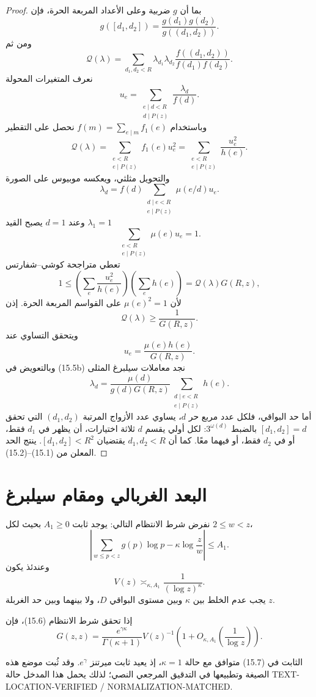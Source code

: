 \begin{proof}
بما أن \(g\) ضربية وعلى الأعداد المربعة الحرة، فإن
\[
g([d_1,d_2])
=
\frac{g(d_1)g(d_2)}{g((d_1,d_2))}.
\]
ومن ثم
\[
\mathcal Q(\lambda)
=
\sum_{d_1,d_2<R}
\lambda_{d_1}\lambda_{d_2}
\frac{f((d_1,d_2))}{f(d_1)f(d_2)}.
\]
نعرف المتغيرات المحولة
\[
u_e=
\sum_{\substack{e\mid d<R\\d\mid P(z)}}
\frac{\lambda_d}{f(d)}.
\]
وباستخدام \(f(m)=\sum_{e\mid m}f_1(e)\) نحصل على التقطير
\[
\mathcal Q(\lambda)
=
\sum_{\substack{e<R\\e\mid P(z)}}f_1(e)u_e^2
=
\sum_{\substack{e<R\\e\mid P(z)}}\frac{u_e^2}{h(e)}.
\tag{15.5a}
\]
والتحويل مثلثي، ويعكسه موبيوس على الصورة
\[
\lambda_d
=
f(d)
\sum_{\substack{d\mid e<R\\e\mid P(z)}}
\mu(e/d)u_e.
\tag{15.5b}
\]
وعند \(d=1\) يصبح القيد \(\lambda_1=1\)
\[
\sum_{\substack{e<R\\e\mid P(z)}}\mu(e)u_e=1.
\]
تعطي متراجحة كوشي--شفارتس
\[
1
\le
\left(\sum_e\frac{u_e^2}{h(e)}\right)
\left(\sum_e h(e)\right)
=
\mathcal Q(\lambda)G(R,z),
\]
لأن \(\mu(e)^2=1\) على القواسم المربعة الحرة. إذن
\[
\mathcal Q(\lambda)\ge\frac1{G(R,z)}.
\]
ويتحقق التساوي عند
\[
u_e=\frac{\mu(e)h(e)}{G(R,z)}.
\]
وبالتعويض في (15.5b) نجد معاملات سيلبرغ المثلى
\[
\boxed{
\lambda_d
=
\frac{\mu(d)}{g(d)G(R,z)}
\sum_{\substack{d\mid e<R\\e\mid P(z)}}h(e)
}.
\tag{15.5c}
\]
أما حد البواقي، فلكل عدد مربع حر \(d\)، يساوي عدد الأزواج المرتبة
\((d_1,d_2)\) التي تحقق \([d_1,d_2]=d\) بالضبط \(3^{\omega(d)}\): لكل أولي
يقسم \(d\) ثلاثة اختيارات، أن يظهر في \(d_1\) فقط، أو في \(d_2\) فقط، أو
فيهما معًا. كما أن \(d_1,d_2<R\) يقتضيان \([d_1,d_2]<R^2\). ينتج الحد
المعلن من (15.1)--(15.2).
\end{proof}

\section{البعد الغربالي ومقام سيلبرغ}

نفرض شرط الانتظام التالي: يوجد ثابت \(A_1\ge0\) بحيث لكل \(2\le w<z\)،
\[
\left|
\sum_{w\le p<z}g(p)\log p
-
\kappa\log\frac zw
\right|
\le A_1.
\tag{15.6}
\]
وعندئذ يكون
\[
V(z)\asymp_{\kappa,A_1}\frac1{(\log z)^\kappa}.
\]
يجب عدم الخلط بين \(\kappa\) وبين مستوى البواقي \(D\)، ولا بينهما وبين حد
الغربلة \(z\).

\begin{theorem}
\label{thm:chapter15-selberg-denominator}
إذا تحقق شرط الانتظام (15.6)، فإن
\[
G(z,z)
=
\frac{e^{\gamma\kappa}}{\Gamma(\kappa+1)}
V(z)^{-1}
\left(1+O_{\kappa,A_1}\!\left(\frac1{\log z}\right)\right).
\tag{15.7}
\]
\end{theorem}
الثابت في (15.7) متوافق مع حالة \(\kappa=1\)، إذ يعيد ثابت ميرتنز
\(e^\gamma\). وقد ثُبت موضع هذه الصيغة وتطبيعها في التدقيق المرجعي النصي؛ لذلك
يحمل هذا المدخل حالة
\textenglish{TEXT-LOCATION-VERIFIED / NORMALIZATION-MATCHED}.
